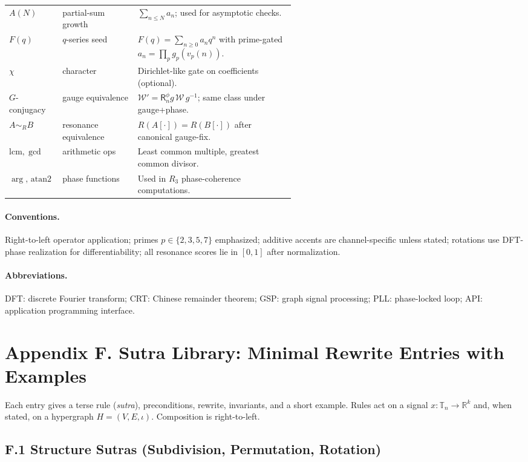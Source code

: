 \documentclass[12pt]{article}
\numberwithin{equation}{section}
\theoremstyle{plain}
\theoremstyle{definition}
\theoremstyle{remark}
\begin{document}
\begin{longtable}{@{}llp{0.55\linewidth}@{}}
$A(N)$ & partial-sum growth & $\sum_{n\le N} a_n$; used for asymptotic checks. \\
$F(q)$ & $q$-series seed & $F(q)=\sum_{n\ge 0} a_n q^n$ with prime-gated $a_n=\prod_p g_p(v_p(n))$. \\
$\chi$ & character & Dirichlet-like gate on coefficients (optional). \\
$G$-conjugacy & gauge equivalence & $\mathcal{W}'=\mathsf{R}_n^{\phi} g\,\mathcal{W}\,g^{-1}$; same class under gauge+phase. \\
$A\sim_R B$ & resonance equivalence & $R(A[\cdot])=R(B[\cdot])$ after canonical gauge-fix. \\
$\mathrm{lcm},\gcd$ & arithmetic ops & Least common multiple, greatest common divisor. \\
$\arg,\,\mathrm{atan2}$ & phase functions & Used in $R_3$ phase-coherence computations. \\
\bottomrule
\end{longtable}

\paragraph{Conventions.}
Right-to-left operator application; primes $p\in\{2,3,5,7\}$ emphasized; additive accents are channel-specific unless stated; rotations use DFT-phase realization for differentiability; all resonance scores lie in $[0,1]$ after normalization.

\paragraph{Abbreviations.}
DFT: discrete Fourier transform; CRT: Chinese remainder theorem; GSP: graph signal processing; PLL: phase-locked loop; API: application programming interface.



\section*{Appendix F. Sutra Library: Minimal Rewrite Entries with Examples}

\noindent
Each entry gives a terse rule (\emph{sutra}), preconditions, rewrite, invariants, and a short example. Rules act on a signal $x:\mathbb{T}_n\to\mathbb{R}^k$ and, when stated, on a hypergraph $H=(V,E,\iota)$. Composition is right-to-left.

\subsection*{F.1 Structure Sutras (Subdivision, Permutation, Rotation)}
\end{document}
